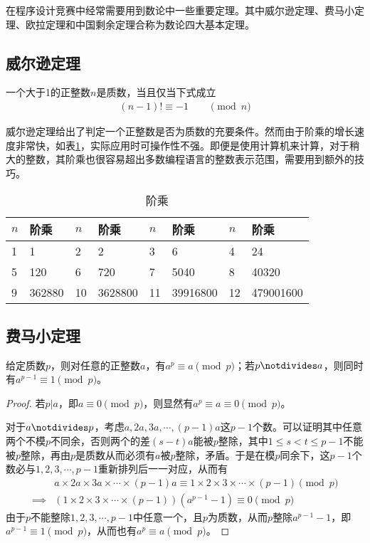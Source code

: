 在程序设计竞赛中经常需要用到数论中一些重要定理。其中威尔逊定理、费马小定理、欧拉定理和中国剩余定理合称为数论四大基本定理。

\subsection{威尔逊定理}
\label{sec:wilson-theorem}
\begin{theorem}
  一个大于1的正整数$n$是质数，当且仅当下式成立
  \begin{align*}
    \left(n-1\right)!\equiv-1 \quad\quad \pmod{n}
  \end{align*}
\end{theorem}

威尔逊定理给出了判定一个正整数是否为质数的充要条件。然而由于阶乘的增长速度非常快，如表\ref{tab:factorial}，实际应用时可操作性不强。即便是使用计算机来计算，对于稍大的整数，其阶乘也很容易超出多数编程语言的整数表示范围，需要用到额外的技巧。
\begin{table}[htbp]
  \centering
  \caption{阶乘}
  \label{tab:factorial}
  \begin{tabular}{ll||ll||ll||ll}
    \hline
    $n$ & 阶乘    & $n$ & 阶乘    & $n$ & 阶乘     & $n$ & 阶乘 \\\hline
    1   & 1      & 2   & 2       & 3   & 6        & 4   & 24\\
    5   & 120    & 6   & 720     & 7   & 5040     & 8   & 40320\\
    9   & 362880 & 10  & 3628800 & 11  & 39916800 & 12  & 479001600\\
    \hline
  \end{tabular}
\end{table}


\subsection{费马小定理}
\label{sec:Fermat-little-theorem}

\begin{theorem}
  给定质数$p$，则对任意的正整数$a$，有$a^p\equiv a\pmod p$；若$p\notdivides a$，则同时有$a^{p-1}\equiv1\pmod p$。
\end{theorem}
\begin{proof}
  若$p|a$，即$a\equiv0\pmod p$，则显然有$a^p\equiv a\equiv0\pmod p$。

  对于$a\notdivides p$，考虑$a,2a,3a,\cdots,(p-1)a$这$p-1$个数。可以证明其中任意两个不模$p$不同余，否则两个的差$(s-t)a$能被$p$整除，其中$1\le s<t\le p-1$不能被$p$整除，再由$p$是质数从而必须有$a$被$p$整除，矛盾。于是在模$p$同余下，这$p-1$个数必与$1,2,3,\cdots,p-1$重新排列后一一对应，从而有
  \begin{align*}
    & a \times 2a \times 3a \times \cdots \times (p-1)a
    \equiv 1 \times 2 \times 3 \times \cdots \times (p-1) \pmod p\\
    \implies & (1\times 2\times 3\times\cdots\times (p-1))(a^{p-1}-1)\equiv0\pmod p
  \end{align*}
  由于$p$不能整除$1,2,3,\cdots,p-1$中任意一个，且$p$为质数，从而$p$整除$a^{p-1}-1$，即$a^{p-1}\equiv1\pmod p$，从而也有$a^p\equiv a\pmod p$。
\end{proof}

